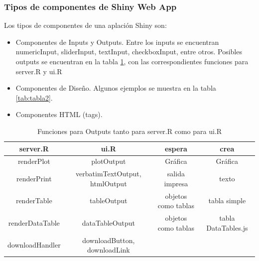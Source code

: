 \subsubsection{Tipos de componentes de Shiny Web App}

Los tipos de componentes de una aplación Shiny son:
\begin{itemize}
\item Componentes de Inputs y Outputs. Entre los inputs se encuentran numericInput, sliderInput, textInput, checkboxInput, entre otros. Posibles outputs se encuentran en la tabla \ref{tab:tabla1}, con las correspondientes funciones para server.R y ui.R
\item Componentes de Diseño. Algunos ejemplos se muestra en la tabla \ref{tab:tabla2}.
\item Componentes HTML (tags).
\end{itemize}


\begin{table}[h]
\begin{center}
\caption{Funciones para Outputs tanto para server.R como para ui.R}
\label{tab:tabla1}
\resizebox{\textwidth}{!} {
\begin{tabular}{cccc}
\hline
server.R & ui.R & espera & crea \\
\hline 
renderPlot & plotOutput & Gráfica & Gráfica\\
renderPrint & verbatimTextOutput, htmlOutput& salida impresa & texto\\
renderTable & tableOutput & objetos como tablas & tabla simple\\
renderDataTable & dataTableOutput & objetos como tablas & tabla DataTables.js\\
downloadHandler	& downloadButton, downloadLink & &\\
\hline 
\end{tabular}
}
\end{center}
\end{table}

